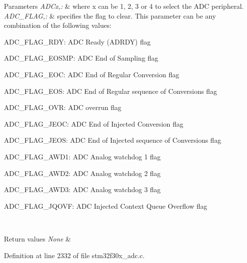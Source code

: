\begin{DoxyParams}{Parameters}
{\em A\-D\-Cx,\-:} & where x can be 1, 2, 3 or 4 to select the A\-D\-C peripheral. \\
\hline
{\em A\-D\-C\-\_\-\-F\-L\-A\-G,\-:} & specifies the flag to clear. This parameter can be any combination of the following values\-: \begin{DoxyItemize}
\item A\-D\-C\-\_\-\-F\-L\-A\-G\-\_\-\-R\-D\-Y\-: A\-D\-C Ready (A\-D\-R\-D\-Y) flag \item A\-D\-C\-\_\-\-F\-L\-A\-G\-\_\-\-E\-O\-S\-M\-P\-: A\-D\-C End of Sampling flag \item A\-D\-C\-\_\-\-F\-L\-A\-G\-\_\-\-E\-O\-C\-: A\-D\-C End of Regular Conversion flag \item A\-D\-C\-\_\-\-F\-L\-A\-G\-\_\-\-E\-O\-S\-: A\-D\-C End of Regular sequence of Conversions flag \item A\-D\-C\-\_\-\-F\-L\-A\-G\-\_\-\-O\-V\-R\-: A\-D\-C overrun flag \item A\-D\-C\-\_\-\-F\-L\-A\-G\-\_\-\-J\-E\-O\-C\-: A\-D\-C End of Injected Conversion flag \item A\-D\-C\-\_\-\-F\-L\-A\-G\-\_\-\-J\-E\-O\-S\-: A\-D\-C End of Injected sequence of Conversions flag \item A\-D\-C\-\_\-\-F\-L\-A\-G\-\_\-\-A\-W\-D1\-: A\-D\-C Analog watchdog 1 flag \item A\-D\-C\-\_\-\-F\-L\-A\-G\-\_\-\-A\-W\-D2\-: A\-D\-C Analog watchdog 2 flag \item A\-D\-C\-\_\-\-F\-L\-A\-G\-\_\-\-A\-W\-D3\-: A\-D\-C Analog watchdog 3 flag \item A\-D\-C\-\_\-\-F\-L\-A\-G\-\_\-\-J\-Q\-O\-V\-F\-: A\-D\-C Injected Context Queue Overflow flag \end{DoxyItemize}
\\
\hline
\end{DoxyParams}

\begin{DoxyRetVals}{Return values}
{\em None} & \\
\hline
\end{DoxyRetVals}


Definition at line 2332 of file stm32f30x\-\_\-adc.\-c.

